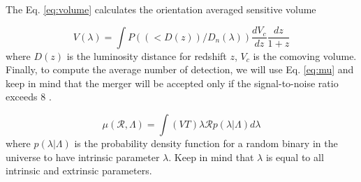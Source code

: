 \documentclass[twocolumn,prd,nofootinbib]{revtex4}
\begin{document}
The Eq. \ref{eq:volume} calculates the orientation averaged sensitive volume \cite{Abbott_2016,richard2010volume}

\begin{equation}
\label{eq:volume}
V(\lambda) = \int P((<D(z))/D_n(\lambda))\frac{dV_c}{dz}\frac{dz}{1+z}
\end{equation}    
where $D(z)$ is the luminosity distance for redshift $z$, $V_c$ is the comoving volume. Finally, to compute the average number of detection, we will use Eq. \ref{eq:mu} and keep in mind that the merger will be accepted only if the signal-to-noise ratio exceeds 8 \cite{SNR_2010}.

\begin{equation}
\label{eq:mu}
  \mu(\mathcal{R},\Lambda) = \int(VT)\lambda \mathcal{R}p(\lambda|\Lambda)d\lambda  
\end{equation}
where $p(\lambda|\Lambda)$ is the probability density function for a random binary in the universe to have intrinsic parameter $\lambda$. Keep in mind that $\lambda$ is equal to all intrinsic and extrinsic parameters.


\end{document}

